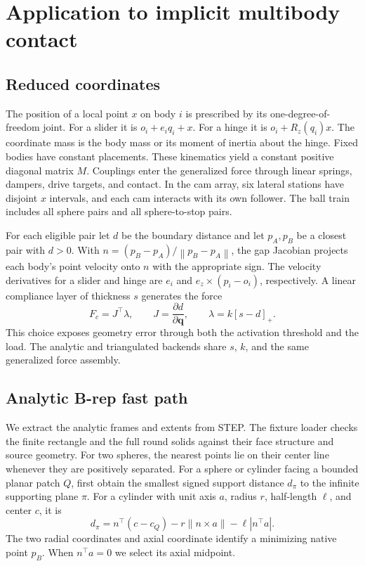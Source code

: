 \documentclass[10pt,a4paper]{article}
\newcommand{\norm}[1]{\left\lVert #1\right\rVert}
\newcommand{\q}{\mathbf q}
\begin{document}


\section{Application to implicit multibody contact}

\subsection{Reduced coordinates}

The position of a local point \(x\) on body \(i\) is prescribed by its one-degree-of-freedom joint. For a slider it is \(o_i+e_i q_i+x\). For a hinge it is \(o_i+R_z(q_i)x\). The coordinate mass is the body mass or its moment of inertia about the hinge. Fixed bodies have constant placements. These kinematics yield a constant positive diagonal matrix \(M\). Couplings enter the generalized force through linear springs, dampers, drive targets, and contact. In the cam array, six lateral stations have disjoint \(x\) intervals, and each cam interacts with its own follower. The ball train includes all sphere pairs and all sphere-to-stop pairs.

For each eligible pair let \(d\) be the boundary distance and let \(p_A,p_B\) be a closest pair with \(d>0\). With \(n=(p_B-p_A)/\norm{p_B-p_A}\), the gap Jacobian projects each body's point velocity onto \(n\) with the appropriate sign. The velocity derivatives for a slider and hinge are \(e_i\) and \(e_z\times(p_i-o_i)\), respectively. A linear compliance layer of thickness \(s\) generates the force
\begin{equation}
    F_c=J^\top\lambda,\qquad
    J=\frac{\partial d}{\partial \q},\qquad
    \lambda=k[s-d]_+.
    \label{eq:compliance}
\end{equation}
This choice exposes geometry error through both the activation threshold and the load. The analytic and triangulated backends share \(s\), \(k\), and the same generalized force assembly.

\subsection{Analytic B-rep fast path}

We extract the analytic frames and extents from STEP. The fixture loader checks the finite rectangle and the full round solids against their face structure and source geometry. For two spheres, the nearest points lie on their center line whenever they are positively separated. For a sphere or cylinder facing a bounded planar patch \(Q\), first obtain the smallest signed support distance \(d_\pi\) to the infinite supporting plane \(\pi\). For a cylinder with unit axis \(a\), radius \(r\), half-length \(\ell\), and center \(c\), it is
\begin{equation}
d_\pi=n^\top(c-c_Q)-r\norm{n\times a}-\ell|n^\top a|.
\end{equation}
The two radial coordinates and axial coordinate identify a minimizing native point \(p_B\). When \(n^\top a=0\) we select its axial midpoint.
\end{document}
